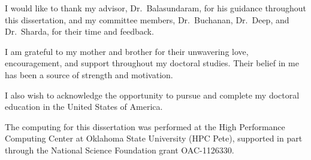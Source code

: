 I would like to thank my advisor, Dr.~Balasundaram, for his guidance
throughout this dissertation, and my committee members,
Dr.~Buchanan, Dr.~Deep, and Dr.~Sharda, for their time and feedback.

I am grateful to my mother and brother for their unwavering love,
encouragement, and support throughout my doctoral studies. Their
belief in me has been a source of strength and motivation.

I also wish to acknowledge the opportunity to pursue and complete my doctoral education in the United States of America.

The computing for this dissertation was performed at the High Performance Computing Center at Oklahoma State University (HPC Pete), supported in part through the National Science Foundation grant OAC-1126330.




